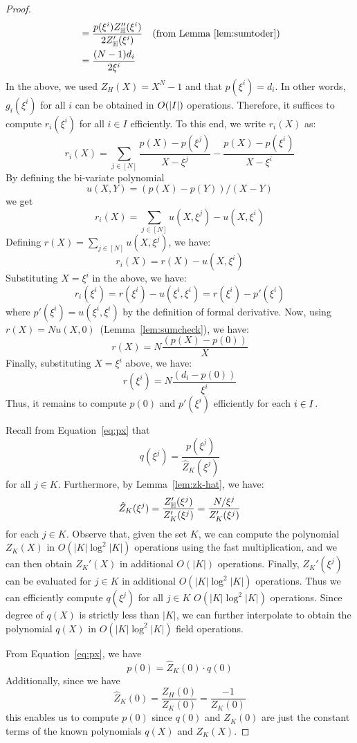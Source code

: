 \begin{proof}
\begin{align*}
        &= \frac{p(\xi^i)Z_{\mathbb{H}}''(\xi^i)}{2 Z_{\mathbb{H}}'(\xi^i)} \quad \text{(from Lemma \ref{lem:sumtoder})} \\
        &= \frac{(N-1)d_i}{2\xi^i}
    \end{align*}
	In the above, we used $Z_H(X)=X^N-1$ and that $p(\xi^i)=d_i$. In other words, $g_i(\xi^i)$ for all $i$ can be obtained in $O(|I|)$ operations. Therefore, it suffices to compute $r_i(\xi^i)$ for all $i \in I$ efficiently. To this end, we write $r_i(X)$ as:
    \[r_i(X) = \sum_{j\in [N]}\frac{p(X)-p(\xi^j)}{X-\xi^j} - \frac{p(X)-p(\xi^i)}{X-\xi^i}\]
    By defining the bi-variate polynomial 
    \[u(X,Y)=(p(X) - p(Y))/(X-Y)\]
    we get
    \[r_i(X)= \sum_{j\in [N]}u(X,\xi^j) - u(X,\xi^i)\]
    Defining $r(X)=\sum_{j\in [N]}u(X,\xi^j)$, we have:
    $$r_i(X)=r(X)-u(X, \xi^i)$$
    Substituting $X = \xi^i$ in the above, we have: 
    $$r_i(\xi^i)=r(\xi^i) - u(\xi^i,\xi^i) = r(\xi^i) - p'(\xi^i)$$
    where $p'(\xi^i) =  u(\xi^i,\xi^i)$ by the definition of formal derivative. Now, using $r(X)=N u(X,0)$~(Lemma~\ref{lem:sumcheck}), we have: 
    \[r(X)=N \frac{(p(X) - p(0))}{X}\] 
    Finally, substituting $X = \xi^i$ above, we have:
    $$r(\xi^i)=N \frac{(d_i - p(0))}{\xi^i}$$
    Thus, it remains to compute $p(0)$ and $p'(\xi^i)$ efficiently for each $i\in I$.
    
    \smallskip
    
     Recall from Equation~\eqref{eq:px} that
    \[q(\xi^j) = \frac{p(\xi^j)}{\widehat{Z}_K(\xi^j)}\]
	for all $j\in K$. Furthermore, by Lemma~\ref{lem:zk-hat}, we have: 
	\[\hat{Z}_K(\xi^j)=\frac{Z_{\mathbb{H}}'(\xi^j)}{Z_K'(\xi^j)}=\frac{{N/\xi^j}}{Z_K'(\xi^j)}\]
	for each $j\in K$. Observe that, given the set $K$, we can compute the polynomial $Z_K(X)$ in $O(|K|\log^2 |K|)$ operations using the fast multiplication, and we can then obtain $Z_K'(X)$ in additional $O(|K|)$ operations. Finally, $Z_K'(\xi^j)$ can be evaluated for $j\in K$ in additional $O(|K|\log^2 |K|)$ operations. Thus we can efficiently compute $q(\xi^j)$ for all $j\in K$  $O(|K|\log^2 |K|)$ operations. Since degree of $q(X)$ is strictly less than $|K|$, we can further interpolate to obtain the polynomial $q(X)$ in $O(|K|\log^2 |K|)$ field operations.
    
    \smallskip
    
     From Equation~\eqref{eq:px}, we have
    \[p(0)=\widehat{Z}_K(0)\cdot q(0)\]
    Additionally, since we have 
    \[\hat{Z}_K(0)=\frac{Z_H(0)}{Z_K(0)}=\frac{-1}{Z_K(0)}\]
    this enables us to compute $p(0)$ since $q(0)$ and $Z_K(0)$ are just the constant terms of the known polynomials $q(X)$ and $Z_K(X)$. 
    

\end{proof}
